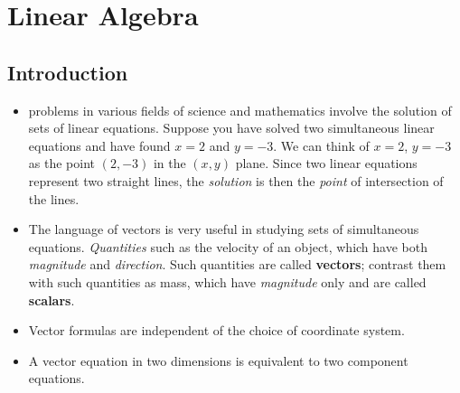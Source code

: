 \chapter{Linear Algebra} \label{ch:linear algebra}
        \section{Introduction}
        \begin{itemize}
            \item problems in various fields of science and mathematics involve the solution of sets of linear equations.
            Suppose you have solved two simultaneous linear equations and have found $x=2$ and $y=-3$. We can think of
            $x=2$, $y=-3$ as the point $(2,-3)$ in the $(x,y)$ plane. Since two linear equations represent two straight lines,
            the \emph{solution} is then the \textit{point} of intersection of the lines.

            \item The language of vectors is very useful in studying sets of simultaneous equations. 
            \textit{Quantities} such as the velocity of an object, which have both \emph{magnitude} and \emph{direction}. 
            Such quantities are called \textbf{vectors}; contrast them with such quantities as mass,
            which have \textit{magnitude} only and are called \textbf{scalars}.
            \item Vector formulas are independent of the choice of coordinate system.
            \item A vector equation in two dimensions is equivalent to two component equations.
        \end{itemize}

